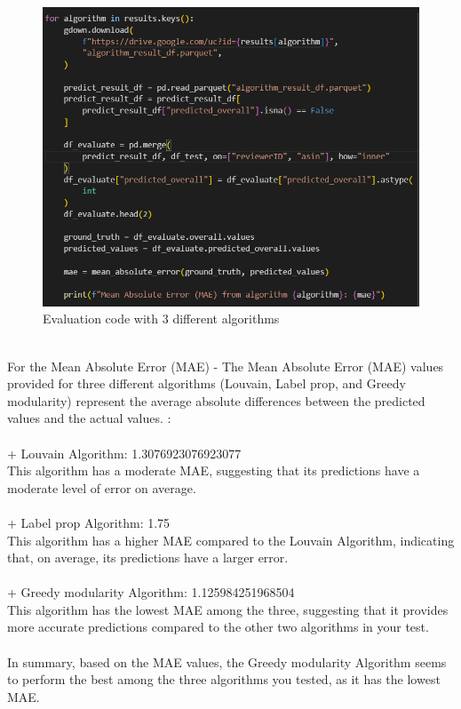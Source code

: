 \begin{figure}
    \centering
    \includegraphics[scale = 0.6]{image/evaluation.png}
    \caption{Evaluation code with 3 different algorithms}
    \label{fig:enter-label}
\end{figure}
\\
\indent For the Mean Absolute Error (MAE) - 
The Mean Absolute Error (MAE) values provided for three different algorithms (Louvain, Label prop, and Greedy modularity) represent the average absolute differences between the predicted values and the actual values. : \\ \\
+ Louvain Algorithm: 1.3076923076923077 \\
This algorithm has a moderate MAE, suggesting that its predictions have a moderate level of error on average.\\
\\
+ Label prop Algorithm: 1.75 \\
This algorithm has a higher MAE compared to the Louvain Algorithm, indicating that, on average, its predictions have a larger error.\\
\\
+ Greedy modularity Algorithm: 1.125984251968504 \\
This algorithm has the lowest MAE among the three, suggesting that it provides more accurate predictions compared to the other two algorithms in your test.\\
\\
\indent In summary, based on the MAE values, the Greedy modularity Algorithm seems to perform the best among the three algorithms you tested, as it has the lowest MAE. 
